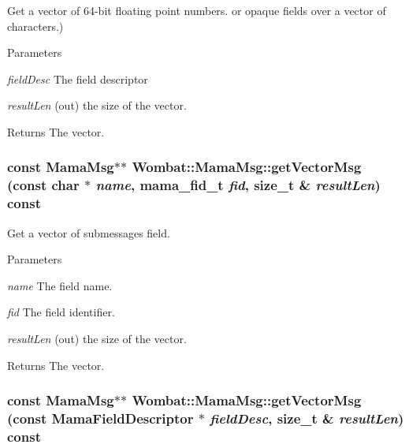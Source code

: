 Get a vector of 64-\/bit floating point numbers. or opaque fields over a vector of characters.) 
\begin{DoxyParams}{Parameters}
\item[{\em fieldDesc}]The field descriptor \item[{\em resultLen}](out) the size of the vector. \end{DoxyParams}
\begin{DoxyReturn}{Returns}
The vector. 
\end{DoxyReturn}
\hypertarget{classWombat_1_1MamaMsg_a9dad9e7ddec799ffd3e60c228e5a0ef1}{
\subsubsection[{getVectorMsg}]{\setlength{\rightskip}{0pt plus 5cm}const {\bf MamaMsg}$\ast$$\ast$ Wombat::MamaMsg::getVectorMsg (const char $\ast$ {\em name}, \/  mama\_\-fid\_\-t {\em fid}, \/  size\_\-t \& {\em resultLen}) const}}
\label{classWombat_1_1MamaMsg_a9dad9e7ddec799ffd3e60c228e5a0ef1}


Get a vector of submessages field. 
\begin{DoxyParams}{Parameters}
\item[{\em name}]The field name. \item[{\em fid}]The field identifier. \item[{\em resultLen}](out) the size of the vector. \end{DoxyParams}
\begin{DoxyReturn}{Returns}
The vector. 
\end{DoxyReturn}
\hypertarget{classWombat_1_1MamaMsg_abb7ec901a227a9168efbf4fcb75f0c25}{
\subsubsection[{getVectorMsg}]{\setlength{\rightskip}{0pt plus 5cm}const {\bf MamaMsg}$\ast$$\ast$ Wombat::MamaMsg::getVectorMsg (const {\bf MamaFieldDescriptor} $\ast$ {\em fieldDesc}, \/  size\_\-t \& {\em resultLen}) const}}
\label{classWombat_1_1MamaMsg_abb7ec901a227a9168efbf4fcb75f0c25}


